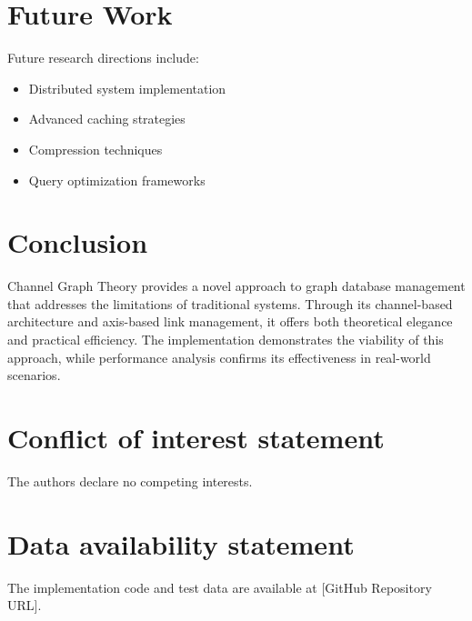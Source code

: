 \section{Future Work}\label{Sec:Future}
Future research directions include:
\begin{itemize}
    \item Distributed system implementation
    \item Advanced caching strategies
    \item Compression techniques
    \item Query optimization frameworks
\end{itemize}

\section{Conclusion}\label{Sec:Conclusion}
Channel Graph Theory provides a novel approach to graph database management that addresses the limitations of traditional systems. Through its channel-based architecture and axis-based link management, it offers both theoretical elegance and practical efficiency. The implementation demonstrates the viability of this approach, while performance analysis confirms its effectiveness in real-world scenarios.

\section*{Conflict of interest statement}
The authors declare no competing interests.

\section*{Data availability statement}
The implementation code and test data are available at [GitHub Repository URL].



